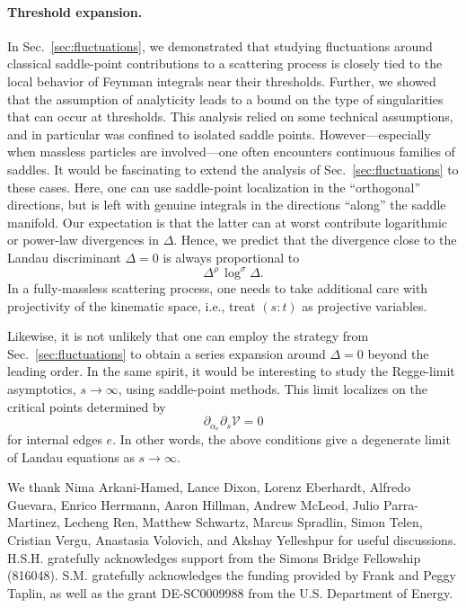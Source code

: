 \documentclass[12pt]{article}
\numberwithin{figure}{section}
\def \be {\begin{equation}}
\def \ee {\end{equation}}
\def \V {\mathcal{V}}
\begin{document}
\paragraph{Threshold expansion.}
In Sec.~\ref{sec:fluctuations}, we demonstrated that studying fluctuations around classical saddle-point contributions to a scattering process is closely tied to the local behavior of Feynman integrals near their thresholds. Further, we showed that the assumption of analyticity leads to a bound on the type of singularities that can occur at thresholds. This analysis relied on some technical assumptions, and in particular was confined to isolated saddle points. However---especially when massless particles are involved---one often encounters continuous families of saddles. It would be fascinating to extend the analysis of Sec.~\ref{sec:fluctuations} to these cases. Here, one can use saddle-point localization in the ``orthogonal'' directions, but is left with genuine integrals in the directions ``along'' the saddle manifold. Our expectation is that the latter can at worst contribute logarithmic or power-law divergences in $\Delta$. Hence, we predict that the divergence close to the Landau discriminant $\Delta =0$ is always proportional to
%
\be
\Delta^\rho\, \log^{\sigma} \!\Delta.
\ee
%
In a fully-massless scattering process, one needs to take additional care with projectivity of the kinematic space, i.e., treat $(s : t)$ as projective variables.

Likewise, it is not unlikely that one can employ the strategy from Sec.~\ref{sec:fluctuations} to obtain a series expansion around $\Delta = 0$ beyond the leading order. In the same spirit, it would be interesting to study the Regge-limit asymptotics, $s \to \infty$, using saddle-point methods. This limit localizes on the critical points determined by
%
\be
\partial_{\alpha_e} \partial_s \V = 0
\ee
%
for internal edges $e$. In other words, the above conditions give a degenerate limit of Landau equations as $s \to \infty$.






\acknowledgments
We thank Nima Arkani-Hamed, Lance Dixon, Lorenz Eberhardt, Alfredo Guevara, Enrico Herrmann, Aaron Hillman, Andrew McLeod, Julio Parra-Martinez, Lecheng Ren, Matthew Schwartz, Marcus Spradlin, Simon Telen, Cristian Vergu, Anastasia Volovich, and Akshay Yelleshpur for useful discussions.
H.S.H. gratefully acknowledges support from the Simons Bridge Fellowship (816048).
S.M. gratefully acknowledges the funding provided by Frank and Peggy Taplin, as well as the grant DE-SC0009988 from the U.S. Department of Energy.
\end{document}
